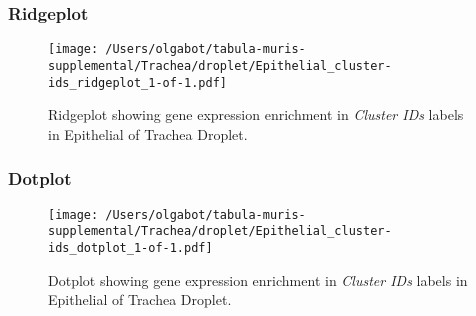 \clearpage

\subsubsection{Ridgeplot}
\begin{figure}[h]
\centering
\texttt{[image: /Users/olgabot/tabula-muris-supplemental/Trachea/droplet/Epithelial\_cluster-ids\_ridgeplot\_1-of-1.pdf]}

\caption{ Ridgeplot  showing gene expression enrichment in \emph{Cluster IDs} labels in Epithelial of Trachea Droplet. }
\end{figure}


\clearpage

\subsubsection{Dotplot}
\begin{figure}[h]
\centering
\texttt{[image: /Users/olgabot/tabula-muris-supplemental/Trachea/droplet/Epithelial\_cluster-ids\_dotplot\_1-of-1.pdf]}

\caption{ Dotplot  showing gene expression enrichment in \emph{Cluster IDs} labels in Epithelial of Trachea Droplet. }
\end{figure}

